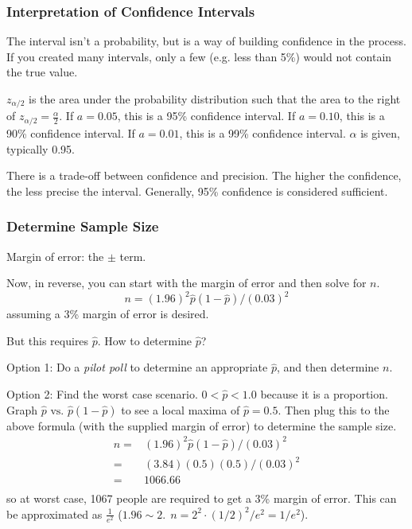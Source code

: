 \documentclass[11pt, oneside]{article}   	%
\begin{document}
\subsubsection{Interpretation of Confidence Intervals}

The interval isn't a probability, but is a way of building confidence in the process. If you created many intervals, only a few (e.g. less than 5\%) would not contain the true value.

$z_{\alpha/2}$ is the area under the probability distribution such that the area to the right of $z_{\alpha/2} = \frac{\alpha}{2}$. If $a = 0.05$, this is a 95\% confidence interval. If $a = 0.10$, this is a 90\% confidence interval. If $a = 0.01$, this is a 99\% confidence interval. $\alpha$ is given, typically 0.95.

There is a trade-off between confidence and precision. The higher the confidence, the less precise the interval. Generally, 95\% confidence is considered sufficient.


\subsubsection{Determine Sample Size}

Margin of error: the $\pm$ term.

Now, in reverse, you can start with the margin of error and then solve for $n$. 
\[
n = (1.96)^2\hat{p}(1-\hat{p}) / (0.03)^2 
\]
assuming a 3\% margin of error is desired.

But this requires $\hat{p}$. How to determine $\hat{p}$?

Option 1: Do a \textit{pilot poll} to determine an appropriate $\hat{p}$, and then determine $n$.

Option 2: Find the worst case scenario.
$0 < \hat{p} < 1.0$ because it is a proportion. Graph $\hat{p} \text{ vs. } \hat{p}(1-\hat{p})$ to see a local maxima of $\hat{p} = 0.5$. Then plug this to the above formula (with the supplied margin of error) to determine the sample size.
\begin{align*}
n =& (1.96)^2\hat{p}(1-\hat{p}) / (0.03)^2 \\
   =& (3.84)(0.5)(0.5) / (0.03)^2 \\
   =& 1066.66 \\
\end{align*}
so at worst case, 1067 people are required to get a 3\% margin of error. This can be approximated as $\frac{1}{e^2}$ ($1.96 \sim 2. \ \ n = 2^2\cdot (1/2)^2 / e^2 = 1/e^2$). 
\end{document}
